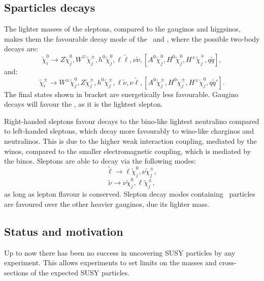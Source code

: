 	\subsection*{Sparticles decays}
	The lighter masses of the sleptons, compared to the gauginos and higgsinos, makes them the favourable decay mode of the \chinopm\ and \nino, where the possible two-body decays are:
	\begin{equation}
	\tilde{\chi}_i^0 \rightarrow Z \tilde{\chi}_j^0, W^{\mp} \tilde{\chi}_j^{\pm},  h^0 \tilde{\chi}_j^{0},  \ell \tilde{\ell},  \nu \tilde{\nu} ,  \left[  A^0 \tilde{\chi}_j^0,  H^0 \tilde{\chi}_j^{0}, H^{\pm} \tilde{\chi}_j^{\mp} ,  q \tilde{q}  \right],
	\end{equation}
	and:
	\begin{equation}
	\tilde{\chi}_i^{\pm} \rightarrow W^{\pm} \tilde{\chi}_j^0, Z \tilde{\chi}_j^{\pm},  h^0 \tilde{\chi}_j^{\pm},  \ell \tilde{\nu},  \nu \tilde{\ell} ,  \left[  A^0 \tilde{\chi}_j^{\pm},  H^0 \tilde{\chi}_j^{\pm}, H^{\pm} \tilde{\chi}_j^{0} ,  q \tilde{q}'  \right].
	\end{equation}
	 The final states shown in bracket are energetically less favourable. Gaugino decays will favour the \stau, as it is the lightest slepton.  
	 
	 Right-handed sleptons favour decays to the bino-like lightest neutralino compared to left-handed sleptons, which decay more favourably to wino-like charginos and neutralinos. This is due to the higher weak interaction coupling, mediated by the winos, compared to the smaller electromagnetic coupling, which is mediated by the binos. 
	 Sleptons are able to decay via the following modes:
	 \begin{equation}
	 \tilde{\ell} \rightarrow \ell \tilde{\chi}_j^0, \nu \tilde{\chi}_j^{\pm},
	 \end{equation}
	  \begin{equation}
	 \tilde{\nu} \rightarrow \nu \tilde{\chi}_j^0, \ell \tilde{\chi}_j^{\pm},
	 \end{equation}
	as long as lepton flavour is conserved.
	 Slepton decay modes containing \ninoone\ particles are favoured over the other heavier gauginos, due its lighter mass. 
	\subsection*{Status and motivation}
	Up to now there has been no success in uncovering \ac{SUSY} particles by any experiment. 
	This allows experiments to set limits on the masses and cross-sections of the expected \ac{SUSY} particles.
	
